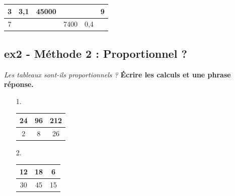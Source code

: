 \documentclass[11pt]{article}
\begin{document}
\begin{center}
  \begin{tabular}{|c|c|c|c|c|c|}
    \hline
   3 &  3,1                   &                  45000 &  \phantom{100 000 000} &  \phantom{100 000 000} &                     9\\ \hline
   7 &  \phantom{100 000 000} &  \phantom{100 000 000} &                   7400 &                    0,4 &  \phantom{100 000 000}\\ \hline     
  \end{tabular}
\end{center}
\Pointilles[5]

\subsection*{ex2 - Méthode 2 : Proportionnel ?}
\textit{Les tableaux sont-ils proportionnels ? } \newline
\textbf{Écrire les calculs et une phrase réponse.}

\begin{minipage}[t]{0.2\textwidth}
  \begin{enumerate}
    \item[1.]
    \begin{tabular}{|c|c|c|}
      \hline
      24 & 96 & 212 \\  \hline
      2 & 8 & 26\\  \hline
    \end{tabular}
  \item[2.]
    \begin{tabular}{|c|c|c|}
      \hline
      12 & 18 & 6 \\  \hline
      30 & 45 & 15\\  \hline
    \end{tabular}
  \end{enumerate}
\end{minipage}
\begin{minipage}[t]{0.8\textwidth}
  \Pointilles[6]
\end{minipage}
\end{document}
